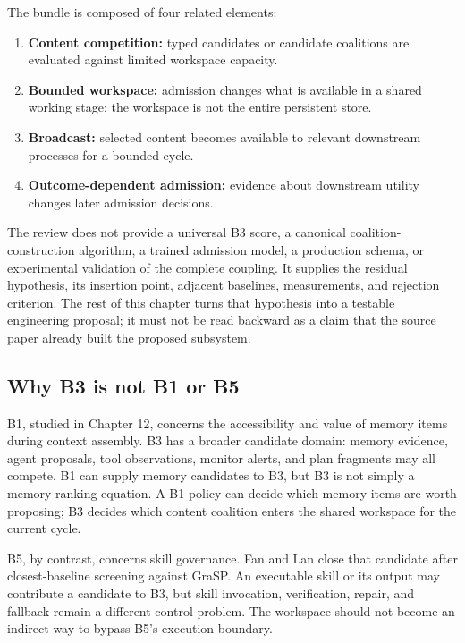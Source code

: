 The bundle is composed of four related elements:
\begin{enumerate}
  \item \textbf{Content competition:} typed candidates or candidate coalitions are evaluated against limited workspace capacity.
  \item \textbf{Bounded workspace:} admission changes what is available in a shared working stage; the workspace is not the entire persistent store.
  \item \textbf{Broadcast:} selected content becomes available to relevant downstream processes for a bounded cycle.
  \item \textbf{Outcome-dependent admission:} evidence about downstream utility changes later admission decisions.
\end{enumerate}

The review does not provide a universal B3 score, a canonical coalition-construction algorithm, a trained admission model, a production schema, or experimental validation of the complete coupling. It supplies the residual hypothesis, its insertion point, adjacent baselines, measurements, and rejection criterion. The rest of this chapter turns that hypothesis into a testable engineering proposal; it must not be read backward as a claim that the source paper already built the proposed subsystem.

\subsection{Why B3 is not B1 or B5}

B1, studied in Chapter 12, concerns the accessibility and value of memory items during context assembly. B3 has a broader candidate domain: memory evidence, agent proposals, tool observations, monitor alerts, and plan fragments may all compete. B1 can supply memory candidates to B3, but B3 is not simply a memory-ranking equation. A B1 policy can decide which memory items are worth proposing; B3 decides which content coalition enters the shared workspace for the current cycle.

B5, by contrast, concerns skill governance. Fan and Lan close that candidate after closest-baseline screening against GraSP. An executable skill or its output may contribute a candidate to B3, but skill invocation, verification, repair, and fallback remain a different control problem. The workspace should not become an indirect way to bypass B5's execution boundary.

